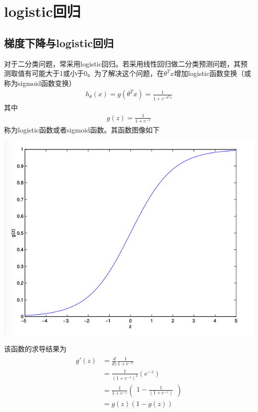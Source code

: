 \section{logistic回归}
\subsection{梯度下降与logistic回归}
对于二分类问题，常采用logistic回归。若采用线性回归做二分类预测问题，其预测取值有可能大于1或小于0。为了解决这个问题，在$\theta^Tx$增加logistic函数变换（或称为sigmoid函数变换）
\begin{eqnarray}
h_\theta(x)=g(\theta^Tx)=\frac{1}{1+e^{-\theta^Tx}}
\end{eqnarray}
其中
\begin{eqnarray}
g(z)=\frac{1}{1+e^{-x}}
\end{eqnarray}
称为logistic函数或者sigmoid函数。其函数图像如下
\begin{center}
\includegraphics[scale=0.5]{../figures/cs229_2_1.png} 
\end{center}
该函数的求导结果为
\begin{eqnarray}
\begin{aligned}
g'(z) &= \frac{d}{dz}\frac{1}{1+e^{-x}}\\
&= \frac{1}{(1+e^{-z})^2}(e^{-z})\\
&= \frac{1}{1+e^{-z}}
\left(
\begin{aligned}
1-\frac{1}{(1+e^{-z})}
\end{aligned}
\right)\\
&= g(z)(1-g(z))
\end{aligned}
\end{eqnarray}

